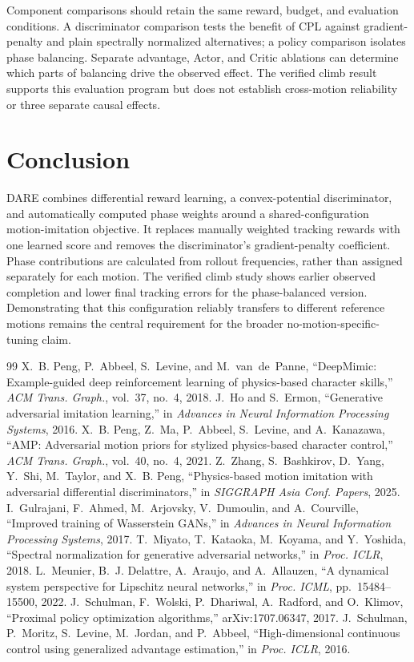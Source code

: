 \documentclass[letterpaper,10pt,conference]{ieeeconf}
\begin{document}
Component comparisons should retain the same reward, budget, and evaluation
conditions. A discriminator comparison tests the benefit of CPL against
gradient-penalty and plain spectrally normalized alternatives; a policy
comparison isolates phase balancing. Separate advantage, Actor, and Critic
ablations can determine which parts of balancing drive the observed effect.
The verified climb result supports this evaluation program but does not
establish cross-motion reliability or three separate causal effects.

\section{Conclusion}
DARE combines differential reward learning, a convex-potential discriminator,
and automatically computed phase weights around a shared-configuration
motion-imitation objective. It replaces manually weighted tracking rewards
with one learned score and removes the discriminator's gradient-penalty
coefficient. Phase contributions are calculated from rollout frequencies,
rather than assigned separately for each motion. The verified climb study
shows earlier observed completion and lower final tracking errors for
the phase-balanced version. Demonstrating that this configuration reliably
transfers to different reference motions remains the central requirement
for the broader no-motion-specific-tuning claim.

\begin{thebibliography}{99}
X.~B. Peng, P.~Abbeel, S.~Levine, and M.~van~de~Panne, ``DeepMimic:
Example-guided deep reinforcement learning of physics-based character
skills,'' \emph{ACM Trans. Graph.}, vol.~37, no.~4, 2018.
J.~Ho and S.~Ermon, ``Generative adversarial imitation learning,'' in
\emph{Advances in Neural Information Processing Systems}, 2016.
X.~B. Peng, Z.~Ma, P.~Abbeel, S.~Levine, and A.~Kanazawa, ``AMP: Adversarial
motion priors for stylized physics-based character control,''
\emph{ACM Trans. Graph.}, vol.~40, no.~4, 2021.
Z.~Zhang, S.~Bashkirov, D.~Yang, Y.~Shi, M.~Taylor, and X.~B. Peng,
``Physics-based motion imitation with adversarial differential
discriminators,'' in \emph{SIGGRAPH Asia Conf. Papers}, 2025.
I.~Gulrajani, F.~Ahmed, M.~Arjovsky, V.~Dumoulin, and A.~Courville,
``Improved training of Wasserstein GANs,'' in \emph{Advances in Neural
Information Processing Systems}, 2017.
T.~Miyato, T.~Kataoka, M.~Koyama, and Y.~Yoshida, ``Spectral normalization
for generative adversarial networks,'' in \emph{Proc. ICLR}, 2018.
L.~Meunier, B.~J. Delattre, A.~Araujo, and A.~Allauzen, ``A dynamical system
perspective for Lipschitz neural networks,'' in \emph{Proc. ICML},
pp.~15484--15500, 2022.
J.~Schulman, F.~Wolski, P.~Dhariwal, A.~Radford, and O.~Klimov,
``Proximal policy optimization algorithms,'' arXiv:1707.06347, 2017.
J.~Schulman, P.~Moritz, S.~Levine, M.~Jordan, and P.~Abbeel,
``High-dimensional continuous control using generalized advantage
estimation,'' in \emph{Proc. ICLR}, 2016.
\end{thebibliography}
\end{document}
